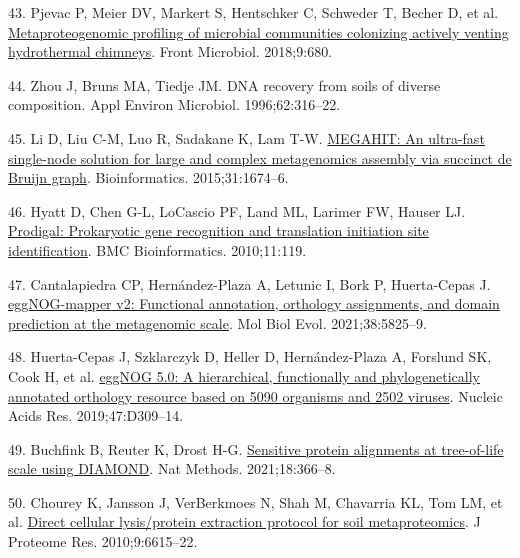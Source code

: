 \documentclass[
  12 pt,
]{article}
\newlength{\cslhangindent}
\newlength{\cslentryspacingunit} %
\newenvironment{CSLReferences}[2] %
 {%
  \setlength{\parindent}{0pt}
  \ifodd #1
  \let\oldpar\par
  \def\par{\hangindent=\cslhangindent\oldpar}
  \fi
  \setlength{\parskip}{#2\cslentryspacingunit}
 }%
 {}
\begin{document}
\begin{CSLReferences}{0}{0}
\leavevmode{}%
43. Pjevac P, Meier DV, Markert S, Hentschker C, Schweder T, Becher D, et al. \href{https://doi.org/10.3389/fmicb.2018.00680}{Metaproteogenomic profiling of microbial communities colonizing actively venting hydrothermal chimneys}. Front Microbiol. 2018;9:680.

\leavevmode{}%
44. Zhou J, Bruns MA, Tiedje JM. {DNA} recovery from soils of diverse composition. Appl Environ Microbiol. 1996;62:316--22.

\leavevmode{}%
45. Li D, Liu C-M, Luo R, Sadakane K, Lam T-W. \href{https://doi.org/10.1093/bioinformatics/btv033}{{MEGAHIT}: An ultra-fast single-node solution for large and complex metagenomics assembly via succinct de {Bruijn} graph}. Bioinformatics. 2015;31:1674--6.

\leavevmode{}%
46. Hyatt D, Chen G-L, LoCascio PF, Land ML, Larimer FW, Hauser LJ. \href{https://doi.org/10.1186/1471-2105-11-119}{Prodigal: Prokaryotic gene recognition and translation initiation site identification}. BMC Bioinformatics. 2010;11:119.

\leavevmode{}%
47. Cantalapiedra CP, Hernández-Plaza A, Letunic I, Bork P, Huerta-Cepas J. \href{https://doi.org/10.1093/molbev/msab293}{{eggNOG-mapper} v2: Functional annotation, orthology assignments, and domain prediction at the metagenomic scale}. Mol Biol Evol. 2021;38:5825--9.

\leavevmode{}%
48. Huerta-Cepas J, Szklarczyk D, Heller D, Hernández-Plaza A, Forslund SK, Cook H, et al. \href{https://doi.org/10.1093/nar/gky1085}{{eggNOG} 5.0: A hierarchical, functionally and phylogenetically annotated orthology resource based on 5090 organisms and 2502 viruses}. Nucleic Acids Res. 2019;47:D309--14.

\leavevmode{}%
49. Buchfink B, Reuter K, Drost H-G. \href{https://doi.org/10.1038/s41592-021-01101-x}{Sensitive protein alignments at tree-of-life scale using {DIAMOND}}. Nat Methods. 2021;18:366--8.

\leavevmode{}%
50. Chourey K, Jansson J, VerBerkmoes N, Shah M, Chavarria KL, Tom LM, et al. \href{https://doi.org/10.1021/pr100787q}{Direct cellular lysis/protein extraction protocol for soil metaproteomics}. J Proteome Res. 2010;9:6615--22.


\end{CSLReferences}
\end{document}
